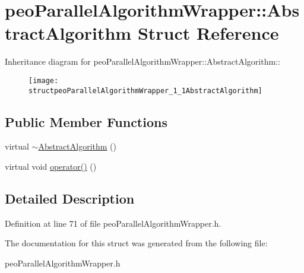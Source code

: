 \hypertarget{structpeoParallelAlgorithmWrapper_1_1AbstractAlgorithm}{
\section{peo\-Parallel\-Algorithm\-Wrapper::Abstract\-Algorithm Struct Reference}
\label{structpeoParallelAlgorithmWrapper_1_1AbstractAlgorithm}
}
Inheritance diagram for peo\-Parallel\-Algorithm\-Wrapper::Abstract\-Algorithm::\begin{figure}[H]
\begin{center}
\leavevmode
\texttt{[image: structpeoParallelAlgorithmWrapper\_1\_1AbstractAlgorithm]}
\end{center}
\end{figure}
\subsection*{Public Member Functions}
\begin{CompactItemize}
\item 
\hypertarget{structpeoParallelAlgorithmWrapper_1_1AbstractAlgorithm_af530b7731cb212f8dd74e5a57484a9e}{
virtual \hyperlink{structpeoParallelAlgorithmWrapper_1_1AbstractAlgorithm_af530b7731cb212f8dd74e5a57484a9e}{$\sim$Abstract\-Algorithm} ()}
\label{structpeoParallelAlgorithmWrapper_1_1AbstractAlgorithm_af530b7731cb212f8dd74e5a57484a9e}

\item 
\hypertarget{structpeoParallelAlgorithmWrapper_1_1AbstractAlgorithm_32e08b3810cef49d0b8751645ef79b6f}{
virtual void \hyperlink{structpeoParallelAlgorithmWrapper_1_1AbstractAlgorithm_32e08b3810cef49d0b8751645ef79b6f}{operator()} ()}
\label{structpeoParallelAlgorithmWrapper_1_1AbstractAlgorithm_32e08b3810cef49d0b8751645ef79b6f}

\end{CompactItemize}


\subsection{Detailed Description}




Definition at line 71 of file peo\-Parallel\-Algorithm\-Wrapper.h.

The documentation for this struct was generated from the following file:\begin{CompactItemize}
\item 
peo\-Parallel\-Algorithm\-Wrapper.h\end{CompactItemize}
